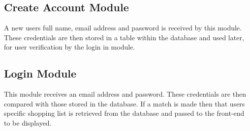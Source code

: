 \documentclass[10pt, a4paper, twocolumn]{scrartcl}
\begin{document}
		\subsection{Create Account Module}
			
			A new users full name, email address and password is received by this module. These credentials are then stored in a table within the database and used later, for user verification by the login in module.\\
			
		\subsection{Login Module}
				 
			This module receives an email address and password. These credentials are then compared with those stored in the database. If a match is made then that users specific shopping list is retrieved from the database and passed to the front-end to be displayed.\\
\end{document}
